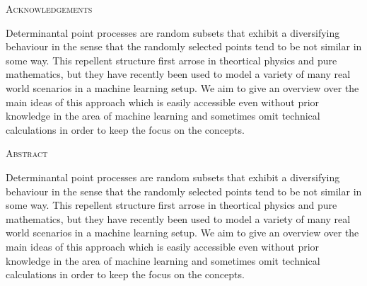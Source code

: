 \begin{center}
\LARGE\textsc{Acknowledgements}\\[.9cm]
\normalsize
\begin{minipage}{11cm}
Determinantal point processes are random subsets that exhibit a diversifying behaviour in the sense that the randomly selected points tend to be not similar in some way. This repellent structure first arrose in theortical physics and pure mathematics, but they have recently been used to model a variety of many real world scenarios in a machine learning setup. We aim to give an overview over the main ideas of this approach which is easily accessible even without prior knowledge in the area of machine learning and sometimes omit technical calculations in order to keep the focus on the concepts.
\end{minipage}
\end{center}

\clearpage


\begin{center}
\LARGE\textsc{Abstract}\\[.9cm]
\normalsize
\begin{minipage}{11cm}
Determinantal point processes are random subsets that exhibit a diversifying behaviour in the sense that the randomly selected points tend to be not similar in some way. This repellent structure first arrose in theortical physics and pure mathematics, but they have recently been used to model a variety of many real world scenarios in a machine learning setup. We aim to give an overview over the main ideas of this approach which is easily accessible even without prior knowledge in the area of machine learning and sometimes omit technical calculations in order to keep the focus on the concepts.
\end{minipage}
\end{center}

\clearpage
